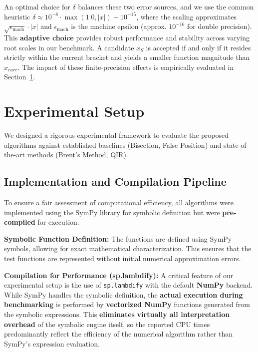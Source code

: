 \documentclass[amsmath, amssymb, aps]{revtex4-2}
\begin{document}
An optimal choice for \textbf{$ \delta $} balances these two error sources, and we use the common heuristic \textbf{$\delta \approx 10^{-8} \cdot \max(1.0, |x|) + 10^{-15}$}, where the scaling approximates \textbf{$ \sqrt{\epsilon_{\text{mach}}} \cdot |x| $} and \textbf{$ \epsilon_{\text{mach}} $} is the machine epsilon (approx. $10^{-16}$ for double precision). This \textbf{adaptive choice} provides robust performance and stability across varying root scales in our benchmark. A candidate \textbf{$x_S$} is accepted if and only if it resides strictly within the current bracket and yields a smaller function magnitude than \textbf{$x_{curr}$}. The impact of these finite-precision effects is empirically evaluated in Section~\ref{sec:experimental}.

\section{Experimental Setup}\label{sec:experimental}

We designed a rigorous experimental framework to evaluate the proposed algorithms against established baselines (Bisection, False Position) and state-of-the-art methods (Brent's Method, QIR).

\subsection{Implementation and Compilation Pipeline}

To ensure a fair assessment of computational efficiency, all algorithms were implemented using the SymPy library for symbolic definition but were \textbf{pre-compiled} for execution. 

\textbf{Symbolic Function Definition:} The functions are defined using SymPy symbols, allowing for exact mathematical characterization. This ensures that the test functions are represented without initial numerical approximation errors.

\textbf{Compilation for Performance (sp.lambdify):} A critical feature of our experimental setup is the use of \texttt{sp.lambdify} with the default \textbf{NumPy} backend. While SymPy handles the symbolic definition, the \textbf{actual execution during benchmarking} is performed by \textbf{vectorized NumPy} functions generated from the symbolic expressions. This \textbf{eliminates} \textbf{virtually all interpretation overhead} of the symbolic engine itself, so the reported CPU times predominantly reflect the efficiency of the numerical algorithm rather than SymPy’s expression evaluation.
\end{document}
